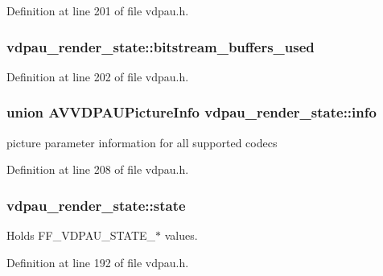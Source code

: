 Definition at line 201 of file vdpau.\+h.

\subsubsection[{\texorpdfstring{bitstream\+\_\+buffers\+\_\+used}{bitstream_buffers_used}}]{ vdpau\+\_\+render\+\_\+state\+::bitstream\+\_\+buffers\+\_\+used}\hypertarget{structvdpau__render__state_ab030c29ece1ef5130f78e69fa19af738}{}\label{structvdpau__render__state_ab030c29ece1ef5130f78e69fa19af738}


Definition at line 202 of file vdpau.\+h.

\subsubsection[{\texorpdfstring{info}{info}}]{\setlength{\rightskip}{0pt plus 5cm}union {\bf A\+V\+V\+D\+P\+A\+U\+Picture\+Info} vdpau\+\_\+render\+\_\+state\+::info}\hypertarget{structvdpau__render__state_a761eb1f0760c95d8e755b4b9ac20c77c}{}\label{structvdpau__render__state_a761eb1f0760c95d8e755b4b9ac20c77c}
picture parameter information for all supported codecs 

Definition at line 208 of file vdpau.\+h.

\subsubsection[{\texorpdfstring{state}{state}}]{ vdpau\+\_\+render\+\_\+state\+::state}\hypertarget{structvdpau__render__state_ab52402f2ec91ac3daf3c39bee6e6b717}{}\label{structvdpau__render__state_ab52402f2ec91ac3daf3c39bee6e6b717}


Holds F\+F\+\_\+\+V\+D\+P\+A\+U\+\_\+\+S\+T\+A\+T\+E\+\_\+$\ast$ values. 



Definition at line 192 of file vdpau.\+h.

